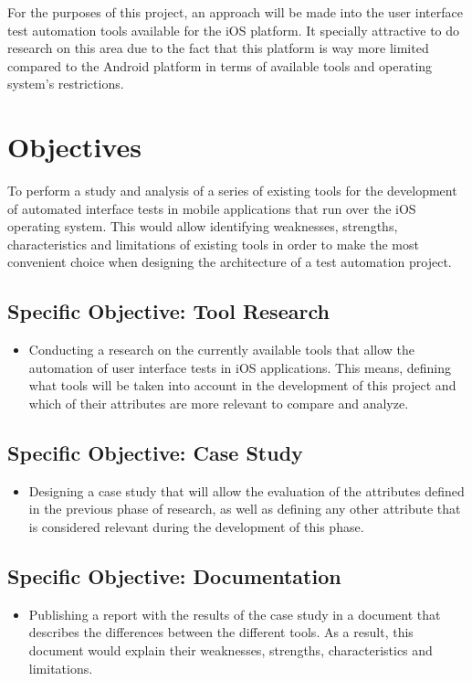 For the purposes of this project, an approach will be made into the user interface test automation tools available for the iOS platform. It specially attractive to do research on this area due to the fact that this platform is way more limited compared to the Android platform in terms of available tools and operating system’s restrictions.

\section{Objectives}
To perform a study and analysis of a series of existing tools for the development of automated interface tests in mobile applications that run over the iOS operating system. This would allow identifying weaknesses, strengths, characteristics and limitations of existing tools in order to make the most convenient choice when designing the architecture of a test automation project.

\subsection{Specific Objective: Tool Research}
\begin{itemize}
	\item Conducting a research on the currently available tools that allow the automation of user interface tests in iOS applications. This means, defining what tools will be taken into account in the development of this project and which of their attributes are more relevant to compare and analyze.
\end{itemize}
\subsection{Specific Objective: Case Study}
\begin{itemize}
	\item Designing a case study that will allow the evaluation of the attributes defined in the previous phase of research, as well as defining any other attribute that is considered relevant during the development of this phase.
\end{itemize}
\subsection{Specific Objective: Documentation}
\begin{itemize}
	\item Publishing a report with the results of the case study in a document that describes the differences between the different tools. As a result, this document would explain their weaknesses, strengths, characteristics and limitations.
\end{itemize}

